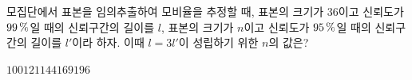 모집단에서 표본을 임의추출하여 모비율을 추정할 때, 표본의 크기가 $36$이고 신뢰도가 $99\mkern3mu \%$일 때의 신뢰구간의 길이를 $l$, 표본의 크기가 $n$이고 신뢰도가 $95\mkern3mu \%$일 때의 신뢰구간의 길이를 $l'$이라 하자. 이때 $l=3l'$이 성립하기 위한 $n$의 값은? 
\begin{choices32}{$100$}{$121$}{$144$}{$169$}{$196$}\end{choices32}
